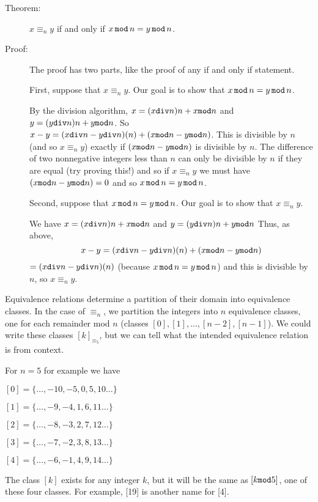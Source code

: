 \documentclass[12pt]{article}
\begin{document}
\begin{description}

\item[Theorem:]  $x \equiv_n y$ if and only if $x \,{\tt mod}\,n = y\,{\tt mod}\,n$.

\item[Proof:]

The proof has two parts, like the proof of any if and only if statement.

First, suppose that $x \equiv_n y$.  Our goal is to show that $x \,{\tt mod}\,n = y\,{\tt mod}\,n$.

By the division algorithm, $x = (x{\tt div}n)n + x{\tt mod}n$ and $y = (y{\tt div}n)n + y{\tt mod}n$.  So $x-y = 
(x{\tt div}n-y{\tt div}n)(n) + (x{\tt mod}n-y{\tt mod}n)$.  This is divisible by $n$ (and so $x \equiv_n y$) exactly if 
$(x{\tt mod}n-y{\tt mod}n)$ is divisible by $n$.  The difference of two nonnegative integers less than $n$ can only be divisible by $n$ if they are equal (try proving this!) and so if $x \equiv_n y$ we must have $(x{\tt mod}n-y{\tt mod}n)=0$ and so $x \,{\tt mod}\,n = y\,{\tt mod}\,n$.

Second, suppose that $x \,{\tt mod}\,n = y\,{\tt mod}\,n$.  Our goal is to show that $x \equiv_n y$.

We have $x = (x{\tt div}n)n + x{\tt mod}n$ and $y = (y{\tt div}n)n + y{\tt mod}n$  Thus, as above, $$x-y = 
(x{\tt div}n-y{\tt div}n)(n) + (x{\tt mod}n-y{\tt mod}n)$$  $= (x{\tt div}n-y{\tt div}n)(n)$ (because $x \,{\tt mod}\,n = y\,{\tt mod}\,n$) and this is divisible by $n$, so $x \equiv_n y$.
\end{description}

Equivalence relations determine a partition of their domain into equivalence classes.  In the case of $\equiv_n$, we partition the integers into $n$ equivalence classes, one for each remainder mod $n$ (classes $[0],[1],\ldots,[n-2],[n-1]$).  We could write these classes $[k]_{\equiv_5}$, but we can tell what the intended equivalence relation is from context.

For $n=5$ for example we have

$[0] = \{\ldots,-10,-5,0,5,10\ldots\}$

$[1] = \{\ldots,-9,-4,1,6,11\ldots\}$

$[2] = \{\ldots,-8,-3,2,7,12\ldots\}$

$[3] = \{\ldots,-7,-2,3,8,13\ldots\}$

$[4] = \{\ldots,-6,-1,4,9,14\ldots\}$

The class $[k]$ exists for any integer $k$, but it will be the same as $[k{\tt mod}5]$, one of these four classes.
For example, [19] is another name for [4].
\end{document}
